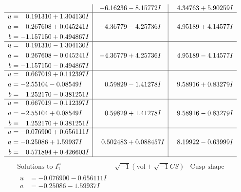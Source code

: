 \documentclass[1p]{elsarticle_modified}
\theoremstyle{definition}
\newcommand{\I}{\sqrt{-1}}
\begin{document}
$$\begin{array}{c|c|c}
 & -6.16236 - 8.15772 I & \phantom{-}4.34763 + 5.90259 I \\ \hline\begin{aligned}
u &= \phantom{-}0.191310 + 1.304130 I \\
a &= \phantom{-}0.267608 + 0.045241 I \\
b &= -1.157150 + 0.494867 I\end{aligned}
 & -4.36779 - 4.25736 I & \phantom{-}4.95189 + 4.14577 I \\ \hline\begin{aligned}
u &= \phantom{-}0.191310 - 1.304130 I \\
a &= \phantom{-}0.267608 - 0.045241 I \\
b &= -1.157150 - 0.494867 I\end{aligned}
 & -4.36779 + 4.25736 I & \phantom{-}4.95189 - 4.14577 I \\ \hline\begin{aligned}
u &= \phantom{-}0.667019 + 0.112397 I \\
a &= -2.55104 - 0.08549 I \\
b &= \phantom{-}1.252170 - 0.381251 I\end{aligned}
 & \phantom{-}0.59829 - 1.41278 I & \phantom{-}9.58916 + 0.83279 I \\ \hline\begin{aligned}
u &= \phantom{-}0.667019 - 0.112397 I \\
a &= -2.55104 + 0.08549 I \\
b &= \phantom{-}1.252170 + 0.381251 I\end{aligned}
 & \phantom{-}0.59829 + 1.41278 I & \phantom{-}9.58916 - 0.83279 I \\ \hline\begin{aligned}
u &= -0.076900 + 0.656111 I \\
a &= -0.25086 + 1.59937 I \\
b &= \phantom{-}0.571894 + 0.426603 I\end{aligned}
 & \phantom{-}0.502483 + 0.088457 I & \phantom{-}8.19922 - 0.63999 I\\
 \hline 
 \end{array}$$\newpage$$\begin{array}{c|c|c}  
\text{Solutions to }I^u_{1}& \I (\text{vol} + \sqrt{-1}CS) & \text{Cusp shape}\\
 \hline 
\begin{aligned}
u &= -0.076900 - 0.656111 I \\
a &= -0.25086 - 1.59937 I \\

\end{aligned}
\end{array}$$
\end{document}
